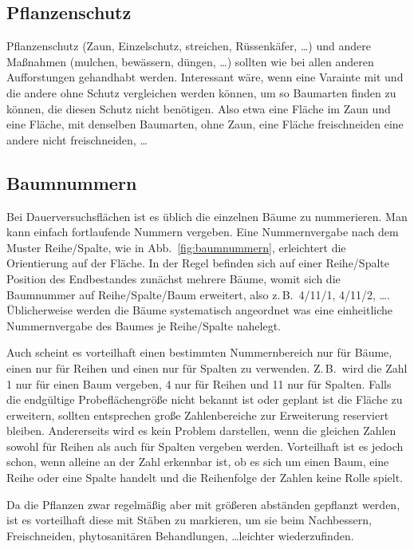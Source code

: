 \documentclass[twocolumn]{scrartcl}
\begin{document}
\subsection{Pflanzenschutz}

Pflanzenschutz (Zaun, Einzelschutz, streichen, Rüssenkäfer, \dots) und andere
Maßnahmen (mulchen, bewässern, düngen, \dots) sollten wie bei allen anderen
Aufforstungen gehandhabt werden. Interessant wäre, wenn eine Varainte mit und
die andere ohne Schutz vergleichen werden können, um so Baumarten finden zu
können, die diesen Schutz nicht benötigen. Also etwa eine Fläche im Zaun und
eine Fläche, mit denselben Baumarten, ohne Zaun, eine Fläche freischneiden eine
andere nicht freischneiden, \dots

\subsection{Baumnummern}

Bei Dauerversuchsflächen ist es üblich die einzelnen Bäume zu nummerieren. Man
kann einfach fortlaufende Nummern vergeben. Eine Nummernvergabe nach dem Muster
Reihe/Spalte, wie in Abb.~\ref{fig:baumnummern}, erleichtert die Orientierung
auf der Fläche. In der Regel befinden sich auf einer Reihe/Spalte Position des
Endbestandes zunächst mehrere Bäume, womit sich die Baumnummer auf
Reihe/Spalte/Baum erweitert, also z.\,B.\ 4/11/1, 4/11/2, \dots. Üblicherweise
werden die Bäume systematisch angeordnet was eine einheitliche Nummernvergabe
des Baumes je Reihe/Spalte nahelegt.

Auch scheint es vorteilhaft einen bestimmten Nummernbereich nur für Bäume, einen
nur für Reihen und einen nur für Spalten zu verwenden. Z.\,B.\ wird die Zahl 1
nur für einen Baum vergeben, 4 nur für Reihen und 11 nur für Spalten. Falls die
endgültige Probeflächengröße nicht bekannt ist oder geplant ist die Fläche zu
erweitern, sollten entsprechen große Zahlenbereiche zur Erweiterung reserviert
bleiben. Andererseits wird es kein Problem darstellen, wenn die gleichen Zahlen
sowohl für Reihen als auch für Spalten vergeben werden. Vorteilhaft ist es
jedoch schon, wenn alleine an der Zahl erkennbar ist, ob es sich um einen Baum,
eine Reihe oder eine Spalte handelt und die Reihenfolge der Zahlen keine Rolle
spielt.

Da die Pflanzen zwar regelmäßig aber mit größeren abständen gepflanzt werden,
ist es vorteilhaft diese mit Stäben zu markieren, um sie beim Nachbessern,
Freischneiden, phytosanitären Behandlungen, \dots leichter wiederzufinden.
\end{document}
